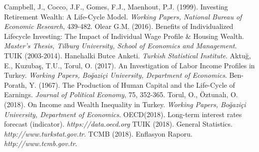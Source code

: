 \begin{thebibliography}{}
 Campbell, J., Cocco, J.F., Gomes, F.J., Maenhout, P.J. (1999). Investing Retirement Wealth: A Life-Cycle Model. \textit{Working Papers, National Bureau of Economic Research}, 439-482.
 Olear G.M. (2016). Benefits of Individualized Lifecycle Investing: The Impact of Individual Wage Profile \& Housing Wealth. \textit{Master's Thesis, Tilburg University, School of Economics and Management}.
 TUIK (2003-2014). Hanehalki Butce Anketi. \textit{Turkish Statistical Institute}.
 Aktuğ, E., Kuzubaş, T.U., Torul, O. (2017). An Investigation of Labor Income Profiles in Turkey. \textit{Working Papers, Boğaziçi  University, Department of Economics}.
 Ben-Porath, Y. (1967). The  Production  of  Human  Capital  and  the  Life-Cycle  of  Earnings. \textit{Journal of Political Economy}, 75, 352-365.
 Torul, O., Öztunalı, O. (2018). On Income and Wealth Inequality in Turkey. \textit{Working Papers, Boğaziçi University, Department of Economics}.
 OECD(2018). Long-term interest rates forecast (indicator). \textit{https://data.oecd.org}
 TUIK (2018). General Statistics. \textit{http://www.turkstat.gov.tr}.
 TCMB (2018). Enflasyon Raporu. \textit{http://www.tcmb.gov.tr}.
\end{thebibliography}
\endgroup
